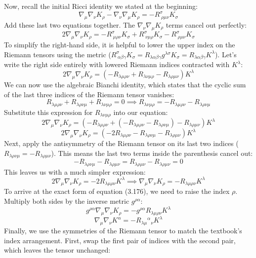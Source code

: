 \documentclass[11pt, a4paper]{report}
\begin{document}
Now, recall the initial Ricci identity we stated at the beginning:
$$\nabla_{\mu} \nabla_{\nu} K_{\rho} - \nabla_{\nu} \nabla_{\mu} K_{\rho} = -R^{\sigma}_{\; \rho\mu\nu} K_{\sigma}$$
Add these last two equations together. The $\nabla_{\nu} \nabla_{\mu} K_{\rho}$ terms cancel out perfectly:
$$2 \nabla_{\mu} \nabla_{\nu} K_{\rho} = - R^{\sigma}_{\; \mu\rho\nu} K_{\sigma} + R^{\sigma}_{\; \nu\mu\rho} K_{\sigma} - R^{\sigma}_{\; \rho\mu\nu} K_{\sigma}$$
To simplify the right-hand side, it is helpful to lower the upper index on the Riemann tensors using the metric ($R^{\sigma}_{\; \alpha\beta\gamma} K_{\sigma} = R_{\lambda\alpha\beta\gamma} g^{\lambda\sigma} K_{\sigma} = R_{\lambda\alpha\beta\gamma} K^{\lambda}$). Let's write the right side entirely with lowered Riemann indices contracted with $K^{\lambda}$:
$$2 \nabla_{\mu} \nabla_{\nu} K_{\rho} = \left( -R_{\lambda\mu\rho\nu} + R_{\lambda\nu\mu\rho} - R_{\lambda\rho\mu\nu} \right) K^{\lambda}$$
We can now use the algebraic Bianchi identity, which states that the cyclic sum of the last three indices of the Riemann tensor vanishes:
$$R_{\lambda\mu\rho\nu} + R_{\lambda\rho\nu\mu} + R_{\lambda\nu\mu\rho} = 0 \implies R_{\lambda\nu\mu\rho} = - R_{\lambda\mu\rho\nu} - R_{\lambda\rho\nu\mu}$$
Substitute this expression for $R_{\lambda\nu\mu\rho}$ into our equation:
$$2 \nabla_{\mu} \nabla_{\nu} K_{\rho} = \left( -R_{\lambda\mu\rho\nu} + (- R_{\lambda\mu\rho\nu} - R_{\lambda\rho\nu\mu}) - R_{\lambda\rho\mu\nu} \right) K^{\lambda}$$
$$2 \nabla_{\mu} \nabla_{\nu} K_{\rho} = \left( -2 R_{\lambda\mu\rho\nu} - R_{\lambda\rho\nu\mu} - R_{\lambda\rho\mu\nu} \right) K^{\lambda}$$
Next, apply the antisymmetry of the Riemann tensor on its last two indices ($R_{\lambda\rho\nu\mu} = -R_{\lambda\rho\mu\nu}$). This means the last two terms inside the parenthesis cancel out:
$$- R_{\lambda\rho\nu\mu} - R_{\lambda\rho\mu\nu} = R_{\lambda\rho\mu\nu} - R_{\lambda\rho\mu\nu} = 0$$
This leaves us with a much simpler expression:
$$2 \nabla_{\mu} \nabla_{\nu} K_{\rho} = -2 R_{\lambda\mu\rho\nu} K^{\lambda} \implies \nabla_{\mu} \nabla_{\nu} K_{\rho} = - R_{\lambda\mu\rho\nu} K^{\lambda}$$
To arrive at the exact form of equation (3.176), we need to raise the index $\rho$. Multiply both sides by the inverse metric $g^{\rho\alpha}$:
$$g^{\rho\alpha} \nabla_{\mu} \nabla_{\nu} K_{\rho} = - g^{\rho\alpha} R_{\lambda\mu\rho\nu} K^{\lambda}$$
$$\nabla_{\mu} \nabla_{\nu} K^{\alpha} = - R_{\lambda\mu}{}^{\alpha}{}_{\nu} K^{\lambda}$$
Finally, we use the symmetries of the Riemann tensor to match the textbook's index arrangement. First, swap the first pair of indices with the second pair, which leaves the tensor unchanged:
\end{document}
